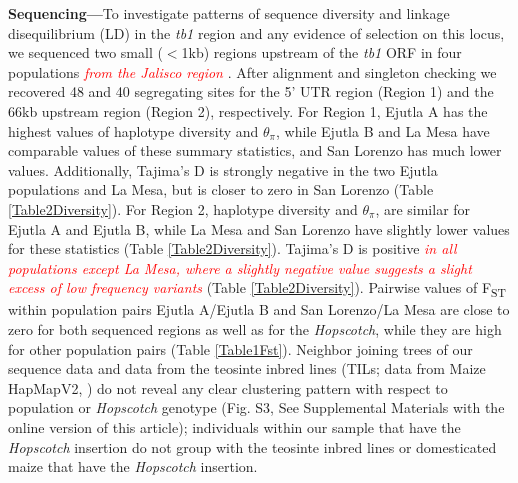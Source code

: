 \documentclass[11pt]{article} %
\newcommand{\track}[1]{\textcolor{red}{\emph{\normalsize #1}} }
\begin{document}
\begin{linenumbers}
\begin{flushleft}
\textbf{Sequencing---}To investigate patterns of sequence diversity and linkage disequilibrium (LD) in the \emph{tb1} region and any evidence of selection on this locus, we sequenced two small ($<$1kb) regions upstream of the \emph{tb1} ORF in four populations \track{from the Jalisco region}. After alignment and singleton checking we recovered 48 and 40 segregating sites for the 5' UTR region (Region 1) and the 66kb upstream region (Region 2), respectively. For Region 1, Ejutla A has the highest values of haplotype diversity and $\theta_\pi$, while Ejutla B and La Mesa have comparable values of these summary statistics, and San Lorenzo has much lower values. Additionally, Tajima's D is strongly negative in the two Ejutla populations and La Mesa, but is closer to zero in San Lorenzo (Table \ref{Table2Diversity}). For Region 2, haplotype diversity and $\theta_\pi$, are similar for Ejutla A and Ejutla B, while La Mesa and San Lorenzo have slightly lower values for these statistics (Table \ref{Table2Diversity}). Tajima's D is positive \track{in all populations except La Mesa, where a slightly negative value suggests a slight excess of low frequency variants} (Table \ref{Table2Diversity}). Pairwise values of F\textsubscript{ST} within population pairs Ejutla A/Ejutla B and San Lorenzo/La Mesa are close to zero for both sequenced regions as well as for the \emph{Hopscotch}, while they are high for other population pairs (Table \ref{Table1Fst}). Neighbor joining trees of our sequence data and data from the teosinte inbred lines (TILs; data from Maize HapMapV2, \citealt{Chia2012}) do not reveal any clear clustering pattern with respect to population or \emph{Hopscotch} genotype (Fig. S3, See Supplemental Materials with the online version of this article); individuals within our sample that have the \emph{Hopscotch} insertion do not group with the teosinte inbred lines or domesticated maize that have the \emph{Hopscotch} insertion. 


\end{flushleft}
\end{linenumbers}
\end{document}
